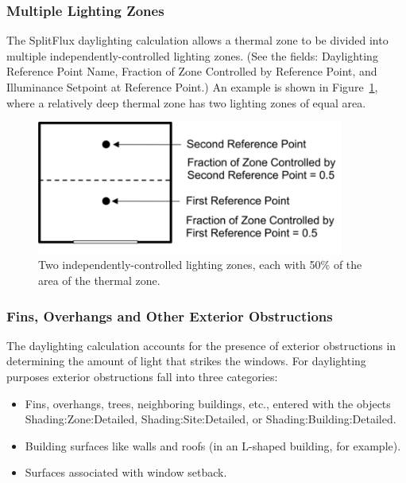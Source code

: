 \subsubsection{Multiple Lighting Zones}\label{multiple-lighting-zones}

The SplitFlux daylighting calculation allows a thermal zone to be divided into multiple independently-controlled lighting zones. (See the fields: Daylighting Reference Point Name, Fraction of Zone Controlled by Reference Point, and Illuminance Setpoint at Reference Point.) An example is shown in Figure~\ref{fig:two-independently-controlled-lighting-zones}, where a relatively deep thermal zone has two lighting zones of equal area.

\begin{figure}[hbtp] %
\centering
\includegraphics[width=0.9\textwidth, height=0.9\textheight, keepaspectratio=true]{media/image100.png}
\caption{Two independently-controlled lighting zones, each with 50\% of the area of the thermal zone. \protect \label{fig:two-independently-controlled-lighting-zones}}
\end{figure}

\subsubsection{Fins, Overhangs and Other Exterior Obstructions}\label{fins-overhangs-and-other-exterior-obstructions}

The daylighting calculation accounts for the presence of exterior obstructions in determining the amount of light that strikes the windows. For daylighting purposes exterior obstructions fall into three categories:

\begin{itemize}
  \item
    Fins, overhangs, trees, neighboring buildings, etc., entered with the objects Shading:Zone:Detailed, Shading:Site:Detailed, or Shading:Building:Detailed.
  \item
    Building surfaces like walls and roofs (in an L-shaped building, for example).
  \item
    Surfaces associated with window setback.
\end{itemize}

